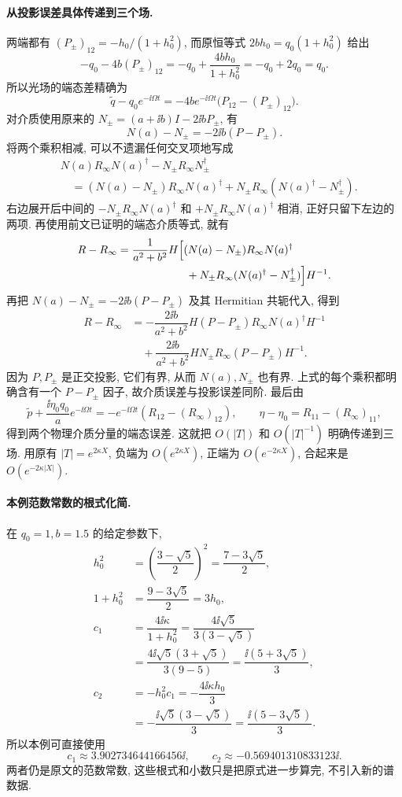 \paragraph{从投影误差具体传递到三个场.}
两端都有 $(P_\pm)_{12}=-h_0/(1+h_0^2)$, 而原恒等式 $2bh_0=q_0(1+h_0^2)$ 给出
\[
-q_0-4b(P_\pm)_{12}
=-q_0+\dfrac{4bh_0}{1+h_0^2}
=-q_0+2q_0=q_0.
\]
所以光场的端态差精确为
\[
\widetilde q-q_0e^{-\ii\Omega t}
=-4b e^{-\ii\Omega t}
\bigl(P_{12}-(P_\pm)_{12}\bigr).
\]
对介质使用原来的 $N_\pm=(a+\ii b)I-2\ii bP_\pm$, 有
\[
N(a)-N_\pm=-2\ii b(P-P_\pm).
\]
将两个乘积相减, 可以不遗漏任何交叉项地写成
\begin{align*}
&N(a)R_\infty N(a)^\dagger-N_\pm R_\infty N_\pm^\dagger\\
&\quad=(N(a)-N_\pm)R_\infty N(a)^\dagger
+N_\pm R_\infty(N(a)^\dagger-N_\pm^\dagger).
\end{align*}
右边展开后中间的 $-N_\pm R_\infty N(a)^\dagger$ 和 $+N_\pm R_\infty N(a)^\dagger$ 相消, 正好只留下左边的两项. 再使用前文已证明的端态介质等式, 就有
\begin{align*}
R-R_\infty
&=\dfrac{1}{a^2+b^2}H\Bigl[
(N(a)-N_\pm)R_\infty N(a)^\dagger\\
&\hspace{22mm}+N_\pm R_\infty(N(a)^\dagger-N_\pm^\dagger)
\Bigr]H^{-1}.
\end{align*}
再把 $N(a)-N_\pm=-2\ii b(P-P_\pm)$ 及其 Hermitian 共轭代入, 得到
\begin{align*}
R-R_\infty
&=-\dfrac{2\ii b}{a^2+b^2}H(P-P_\pm)R_\infty N(a)^\dagger H^{-1}\\
&\quad+\dfrac{2\ii b}{a^2+b^2}HN_\pm R_\infty(P-P_\pm)H^{-1}.
\end{align*}
因为 $P,P_\pm$ 是正交投影, 它们有界, 从而 $N(a),N_\pm$ 也有界. 上式的每个乘积都明确含有一个 $P-P_\pm$ 因子, 故介质误差与投影误差同阶. 最后由
\[
\widetilde p+\dfrac{\ii\eta_0q_0}{a}e^{-\ii\Omega t}
=-e^{-\ii\Omega t}(R_{12}-(R_\infty)_{12}),
\qquad
\eta-\eta_0=R_{11}-(R_\infty)_{11},
\]
得到两个物理介质分量的端态误差. 这就把 $O(|T|)$ 和 $O(|T|^{-1})$ 明确传递到三场. 用原有 $|T|=e^{2\kappa X}$, 负端为 $O(e^{2\kappa X})$, 正端为 $O(e^{-2\kappa X})$, 合起来是 $O(e^{-2\kappa|X|})$.

\paragraph{本例范数常数的根式化简.}
在 $q_0=1,b=1.5$ 的给定参数下,
\begin{align*}
h_0^2&=\left(\dfrac{3-\sqrt{5}}{2}\right)^2
=\dfrac{7-3\sqrt{5}}{2},\\
1+h_0^2&=\dfrac{9-3\sqrt{5}}{2}=3h_0,\\
c_1&=\dfrac{4\ii\kappa}{1+h_0^2}
=\dfrac{4\ii\sqrt{5}}{3(3-\sqrt{5})}\\
&=\dfrac{4\ii\sqrt{5}(3+\sqrt{5})}{3(9-5)}
=\dfrac{\ii(5+3\sqrt{5})}{3},\\
c_2&=-h_0^2c_1
=-\dfrac{4\ii\kappa h_0}{3}\\
&=-\dfrac{\ii\sqrt{5}(3-\sqrt{5})}{3}
=\dfrac{\ii(5-3\sqrt{5})}{3}.
\end{align*}
所以本例可直接使用
\[
c_1\approx3.902734644166456\ii,
\qquad
c_2\approx-0.569401310833123\ii.
\]
两者仍是原文的范数常数, 这些根式和小数只是把原式进一步算完, 不引入新的谱数据.
